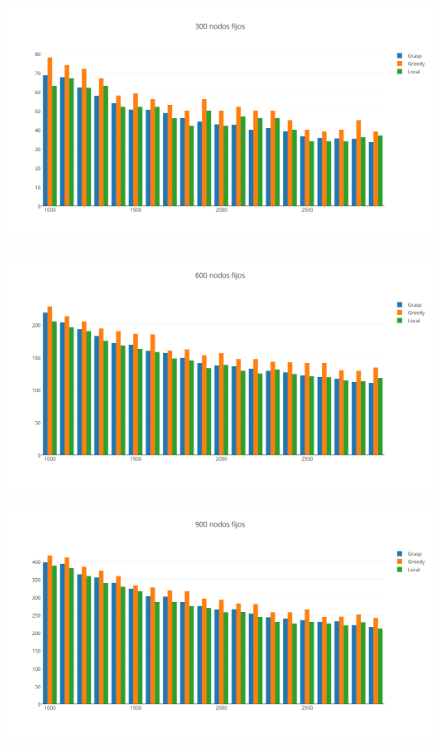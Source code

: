   \begin{figure}[h!]
   \begin{center}
 	\includegraphics[scale=0.7]{imagenes/6/300NodosFijos.png}
   \end{center}
 \end{figure}
 
  \begin{figure}[h!]
   \begin{center}
 	\includegraphics[scale=0.7]{imagenes/6/600NodosFijos.png}
   \end{center}
 \end{figure}
 
  \begin{figure}[h!]
   \begin{center}
 	\includegraphics[scale=0.7]{imagenes/6/900NodosFijos.png}
   \end{center}
 \end{figure}
 
